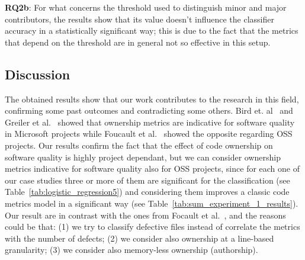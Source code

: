 \textbf{RQ2b}: For what concerns the threshold used to distinguish minor and major contributors, the results show that its value doesn't influence the classifier accuracy in a statistically significant way; this is due to the fact that the metrics that depend on the threshold are in general not so effective in this setup.

\subsection{Discussion}



%
The obtained results show that our work contributes to the research in this field, confirming some past outcomes and contradicting some others.
Bird et. al~\cite{bird:original} and Greiler et al.~\cite{Greiler:replication} showed that ownership metrics are indicative for software quality in Microsoft projects while Foucault et al.~\cite{Foucault:oss} showed the opposite regarding OSS projects. Our results confirm the fact that the effect of code ownership on software quality is highly project dependant, but we can consider ownership metrics indicative for software quality also for OSS projects, since for each one of our case studies three or more of them are significant for the classification (see Table~\ref{tab:logistic_regression5}) and considering them improves a classic code metrics model in a significant way (see Table~\ref{tab:sum_experiment_1_results}). Our result are in contrast with the ones from Focault et al.~\cite{Foucault:oss}, and the reasons could be that: (1) we try to classify defective files instead of correlate the metrics with the number of defects; (2) we consider also ownership at a line-based granularity; (3) we consider also memory-less ownership (authorship).

